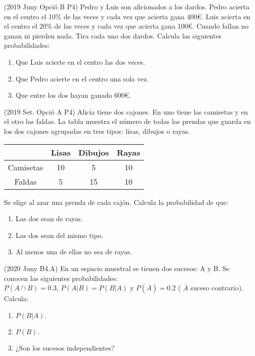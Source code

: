 \item (2019 Juny Opció B P4) Pedro y Luis son aficionados a los dardos. Pedro acierta en el centro el 10\% de las veces y cada vez que acierta gana 400\euro{}. Luis acierta en el centro el 20\% de las veces y cada vez que acierta gana 100\euro{}. Cuando fallan no ganan ni pierden nada. Tira cada uno dos dardos. Calcula las siguientes probabilidades:
\begin{enumerate}
 \item Que Luis acierte en el centro las dos veces.
 \item Que Pedro acierte en el centro una sola vez.
 \item Que entre los dos hayan ganado 600\euro{}.
\end{enumerate}

\item (2019 Set. Opció A P4) Alicia tiene dos cajones. En uno tiene las camisetas y en el otro las faldas. La tabla muestra el número de todas las prendas que guarda en los dos cajones agrupadas en tres tipos: lisas, dibujos o rayas.
\begin{center}
    \begin{tabular}{|c|c|c|c|}
            \hline
            & Lisas & Dibujos & Rayas \\ \hline
            Camisetas & 10 & 5 & 10 \\ \hline
            Faldas & 5 & 15 & 10  \\ \hline
    \end{tabular}
\end{center}
Se elige al azar una prenda de cada cajón. Calcula la probabilidad de que:
\begin{enumerate}
 \item Las dos sean de rayas.
 \item Las dos sean del mismo tipo.
 \item Al menos una de ellas no sea de rayas.
\end{enumerate}


\item (2020 Juny B4.A) En un espacio muestral se tienen dos sucesos: A y B. Se conocen las siguientes probabilidades:\\
$P (A \cap B) = 0.3$, $P (A|B) = P (B|A)$ y $P (\overline{A}) = 0.2$ ( $\overline{A}$ suceso contrario). Calcula:
\begin{enumerate}
 \item $P (B|A).$
 \item $P (B).$
 \item ¿Son los sucesos independientes?
\end{enumerate}

